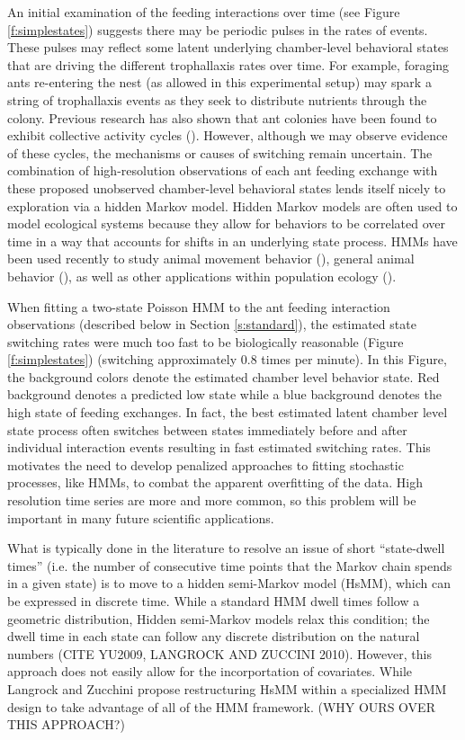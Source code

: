 \documentclass[smallextended]{svjour3}       %
\begin{document}
	An initial examination of the feeding interactions over time (see Figure \ref{f:simplestates}) suggests there may be periodic pulses in the rates of events. These pulses may reflect some latent underlying chamber-level behavioral states that are driving the different trophallaxis rates over time. For example, foraging ants re-entering the nest (as allowed in this experimental setup) may spark a string of trophallaxis events as they seek to distribute nutrients through the colony. Previous research has also shown that ant colonies have been found to exhibit collective activity cycles (\cite{Richardson2017}). However, although we may observe evidence of these cycles, the mechanisms or causes of switching remain uncertain. The combination of high-resolution observations of each ant feeding exchange with these proposed unobserved chamber-level behavioral states lends itself nicely to exploration via a hidden Markov model. Hidden Markov models are often used to model ecological systems because they allow for behaviors to be correlated over time in a way that accounts for shifts in an underlying state process. HMMs have been used recently  to study animal movement behavior (\cite{Langrock2012,McKellar2015, Patterson2017,Towner2016, VandeKerk2015}), general animal behavior (\cite{DeRuiter2016,Langrock2014,Schliehe-Diecks2012}), as well as other applications within population ecology (\cite{Borchers2013,Gimenez2014, Johnson2016, Leos-Barajas2017a}). 
    
    When fitting a two-state Poisson HMM to the ant feeding interaction observations (described below in Section \ref{s:standard}), the estimated state switching rates were much too fast to be biologically reasonable (Figure \ref{f:simplestates}) (switching approximately 0.8 times per minute). In this Figure, the background colors denote the estimated chamber level behavior state. Red background denotes a predicted low state while a blue background denotes the high state of feeding exchanges.  In fact, the best estimated latent chamber level state process often switches between states immediately before and after individual interaction events resulting in fast estimated switching rates. This motivates the need to develop penalized approaches to fitting stochastic processes, like HMMs, to combat the apparent overfitting of the data. High resolution time series are more and more common, so this problem will be important in many future scientific applications. 

    What is typically done in the literature to resolve an issue of short ``state-dwell times'' (i.e. the number of consecutive time points that the Markov chain spends in a given state) is to move to a hidden semi-Markov model (HsMM), which can be expressed in discrete time. While a standard HMM dwell times follow a geometric distribution, Hidden semi-Markov models relax this condition; the dwell time in each state can follow any discrete distribution on the natural numbers (CITE YU2009, LANGROCK AND ZUCCINI 2010). However, this approach does not easily allow for the incorportation of covariates. While Langrock and Zucchini propose restructuring HsMM within a specialized HMM design to take advantage of all of the HMM framework. (WHY OURS OVER THIS APPROACH?)
\end{document}

